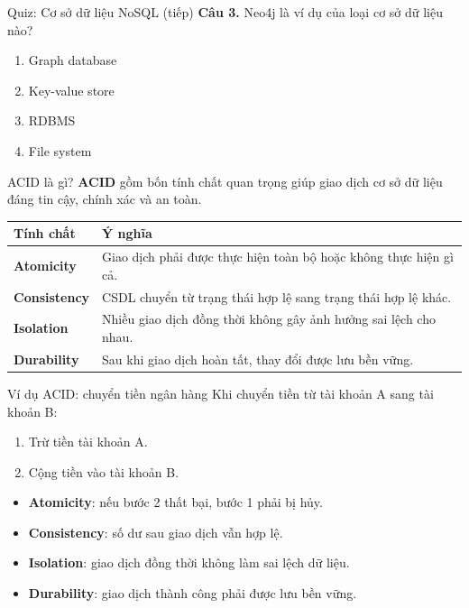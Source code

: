 ﻿\documentclass[aspectratio=169,11pt]{beamer}
\newcommand{\keyword}[1]{\textcolor{accent}{\textbf{#1}}}
\newcommand{\tightlist}{\setlength{\itemsep}{2pt}\setlength{\parskip}{0pt}}
\newcommand{\qoption}[2]{\item[#1.] #2}
\begin{document}
\begin{frame}{Quiz: Cơ sở dữ liệu NoSQL (tiếp)}
\small
\textbf{Câu 3.} Neo4j là ví dụ của loại cơ sở dữ liệu nào?
\begin{enumerate}
\tightlist
  \qoption{A}{Graph database}
  \qoption{B}{Key-value store}
  \qoption{C}{RDBMS}
  \qoption{D}{File system}
\end{enumerate}
\end{frame}

\begin{frame}{ACID là gì?}
\small
\keyword{ACID} gồm bốn tính chất quan trọng giúp giao dịch cơ sở dữ liệu đáng tin cậy, chính xác và an toàn.

\begin{tabularx}{\textwidth}{>{\bfseries}p{} X}
\toprule
Tính chất & Ý nghĩa \\
\midrule
Atomicity & Giao dịch phải được thực hiện toàn bộ hoặc không thực hiện gì cả. \\
Consistency & CSDL chuyển từ trạng thái hợp lệ sang trạng thái hợp lệ khác. \\
Isolation & Nhiều giao dịch đồng thời không gây ảnh hưởng sai lệch cho nhau. \\
Durability & Sau khi giao dịch hoàn tất, thay đổi được lưu bền vững. \\
\bottomrule
\end{tabularx}
\end{frame}

\begin{frame}{Ví dụ ACID: chuyển tiền ngân hàng}
\small
Khi chuyển tiền từ tài khoản A sang tài khoản B:
\begin{enumerate}
\tightlist
  \item Trừ tiền tài khoản A.
  \item Cộng tiền vào tài khoản B.
\end{enumerate}

\begin{itemize}
\tightlist
  \item \textbf{Atomicity}: nếu bước 2 thất bại, bước 1 phải bị hủy.
  \item \textbf{Consistency}: số dư sau giao dịch vẫn hợp lệ.
  \item \textbf{Isolation}: giao dịch đồng thời không làm sai lệch dữ liệu.
  \item \textbf{Durability}: giao dịch thành công phải được lưu bền vững.
\end{itemize}
\end{frame}
\end{document}
